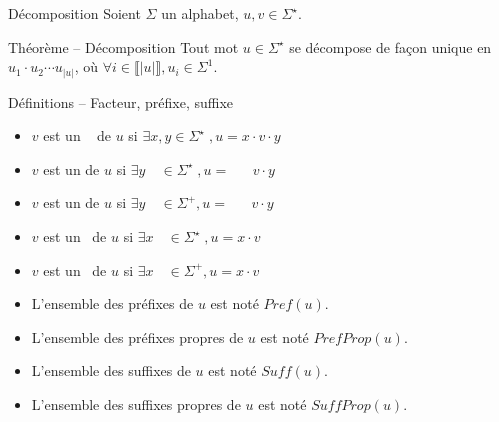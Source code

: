 
\begingroup

\begin{frame}{Décomposition}
  Soient $\Sigma$ un alphabet, $u, v \in \Sigma^\star$.

  \begin{block}{Théorème -- Décomposition}
    Tout mot $u\in \Sigma^\star$ se décompose de façon unique en $u_1\cdot u_2 \cdots u_{|u|}$,
    où $\forall i \in \llbracket |u| \rrbracket, u_i \in \Sigma^1$.
  \end{block}
  
  \begin{block}{Définitions -- Facteur, préfixe, suffixe}
    \begin{itemize}
    \item\vspace{-2mm}  $v$ est un  \phantom{propr}\,\,\, de $u$ si \alert{$\exists x, y           \in \Sigma^\star\;, u = x \cdot v \cdot y$}
    \item\vspace{-.5mm} $v$ est un  \phantom{propre}    de $u$ si \alert{$\exists y\phantom{, x} \in \Sigma^\star\;, u = \phantom {w \cdot }\; v \cdot y$}
    \item\vspace{-.5mm} $v$ est un               de $u$ si \alert{$\exists y\phantom{, x} \in \Sigma^+,      u = \phantom{ w \cdot }\; v \cdot y$}
    \item\vspace{-.5mm} $v$ est un  \phantom{propre}\,    de $u$ si \alert{$\exists x\phantom{, y} \in \Sigma^\star\;, u = x \cdot v$}
    \item\vspace{-.5mm} $v$ est un \,              de $u$ si \alert{$\exists x\phantom{, y} \in \Sigma^+,      u = x \cdot v$}
    \item\vspace{-.5mm} L'ensemble des préfixes de $u$ est noté $\mathit{Pref}(u)$. 
    \item\vspace{-.5mm} L'ensemble des préfixes propres de $u$ est noté $\mathit{PrefProp}(u)$. 
    \item\vspace{-.5mm} L'ensemble des suffixes de $u$ est noté $\mathit{Suff}(u)$. 
    \item\vspace{-.5mm} L'ensemble des suffixes propres de $u$ est noté $\mathit{SuffProp}(u)$. 
    \end{itemize}
  \end{block}
\end{frame}

\endgroup
